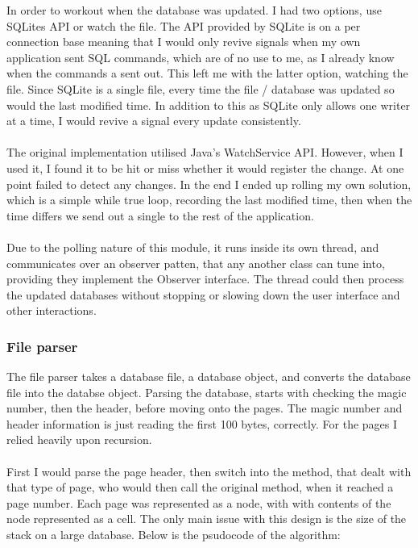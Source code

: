 In order to workout when the database was updated. I had two options, use SQLites API or watch the file. The API provided by SQLite is on a per connection base meaning that I would only revive signals when my own application sent SQL commands, which are of no use to me, as  I already know when the commands a sent out. This left me with the latter option, watching the file. Since SQLite is a single file, every time the file / database was updated so would the last modified time. In addition to this as SQLite only allows one writer at a time, I would revive a signal every update consistently.  
\\\\
The original implementation utilised Java's WatchService API. However, when I used it, I found it to be hit or miss whether it would register the change. At one point failed to detect any changes. In the end I ended up rolling my own solution, which is a simple while true loop, recording the last modified time, then when the time differs we send out a single to the rest of the application. 
\\\\
Due to the polling nature of this module, it runs inside its own thread, and communicates over an observer patten, that any another class can tune into, providing they implement the Observer interface. The thread could then process the updated databases without stopping or slowing down the user interface and other interactions.

\subsubsection{File parser}
\label{subsubsec:file_parser_imp}

The file parser takes a database file, a database object, and converts the database file into the databse object. Parsing the database, starts with checking the magic number, then the header, before moving onto the pages. The magic number and header information is just reading the first 100 bytes, correctly. For the pages I relied heavily upon recursion.
\\\\
First I would parse the page header, then switch into the method, that dealt with that type of page, who would then call the original method, when it reached a page number.  Each page was represented as a node, with with contents of the node represented as a cell. The only main issue with this design is the size of the stack on a large database. Below is the psudocode of the algorithm:

